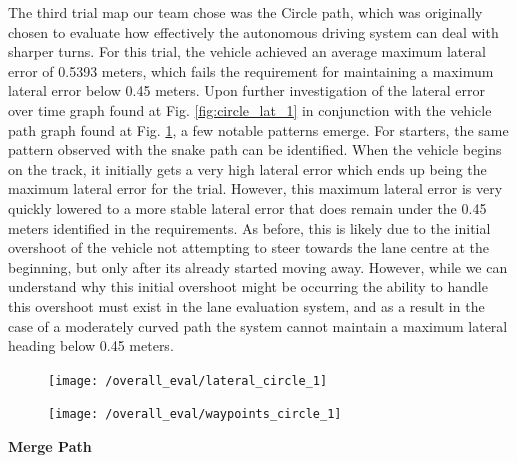 \documentclass[titlepage,draft]{article}
\begin{document}
{The third trial map our team chose was the Circle path, which was originally chosen to evaluate how effectively the autonomous driving system can deal with sharper turns. For this trial, the vehicle achieved an average maximum lateral error of 0.5393 meters, which fails the requirement for maintaining a maximum lateral error below 0.45 meters. Upon further investigation of the lateral error over time graph found at Fig. \ref{fig:circle_lat_1} in conjunction with the vehicle path graph found at Fig. \ref{fig:circle_way_1}, a few notable patterns emerge. For starters, the same pattern observed with the snake path can be identified. When the vehicle begins on the track, it initially gets a very high lateral error which ends up being the maximum lateral error for the trial. However, this maximum lateral error is very quickly lowered to a more stable lateral error that does remain under the 0.45 meters identified in the requirements. As before, this is likely due to the initial overshoot of the vehicle not attempting to steer towards the lane centre at the beginning, but only after its already started moving away. However, while we can understand why this initial overshoot might be occurring the ability to handle this overshoot must exist in the lane evaluation system, and as a result in the case of a moderately curved path the system cannot maintain a maximum lateral heading below 0.45 meters.

\begin{figure}
	\centering
	\begin{minipage}{.45\textwidth}
		\centering
		\texttt{[image: /overall\_eval/lateral\_circle\_1]}
		\label{fig:circle_lat_1}
	\end{minipage}%
	\hspace{0.1\textwidth}%
	\begin{minipage}{.45\textwidth}
		\centering
		\texttt{[image: /overall\_eval/waypoints\_circle\_1]}
		\label{fig:circle_way_1}
	\end{minipage}
\end{figure}

\textbf{Merge Path}

}
\end{document}
